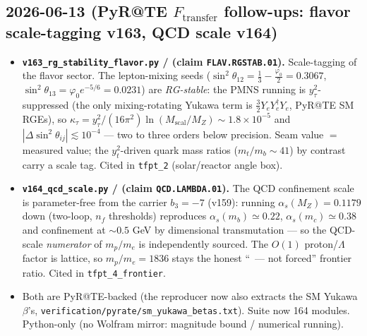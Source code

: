 \subsection*{2026-06-13 (PyR@TE $F_{\mathrm{transfer}}$ follow-ups: flavor scale-tagging v163, QCD scale v164)}
\begin{itemize}
\item \textbf{\texttt{v163\_rg\_stability\_flavor.py} \mE/\mC{} (claim \texttt{FLAV.RGSTAB.01}).}
  Scale-tagging of the flavor sector. The lepton-mixing seeds
  ($\sin^2\theta_{12}=\tfrac13-\tfrac{\varphi_0}{2}=0.3067$,
  $\sin^2\theta_{13}=\varphi_0 e^{-5/6}=0.0231$) are \emph{RG-stable}: the PMNS
  running is $y_\tau^2$-suppressed (the only mixing-rotating Yukawa term is
  $\tfrac32 Y_e Y_e^\dagger Y_e$, PyR@TE SM RGEs), so
  $\kappa_\tau=y_\tau^2/(16\pi^2)\ln(M_{\mathrm{scal}}/M_Z)\sim1.8\times10^{-5}$ and
  $|\Delta\sin^2\theta_{ij}|\lesssim10^{-4}$ --- two to three orders below precision.
  Seam value $=$ measured value; the $y_t^2$-driven quark mass ratios ($m_t/m_b\sim41$)
  by contrast carry a scale tag. Cited in \texttt{tfpt\_2} (solar/reactor angle box).
\item \textbf{\texttt{v164\_qcd\_scale.py} \mE/\mO{} (claim \texttt{QCD.LAMBDA.01}).}
  The QCD confinement scale is parameter-free from the carrier $b_3=-7$ (v159):
  running $\alpha_s(M_Z)=0.1179$ down (two-loop, $n_f$ thresholds) reproduces
  $\alpha_s(m_b)\simeq0.22$, $\alpha_s(m_c)\simeq0.38$ and confinement at
  $\sim0.5$ GeV by dimensional transmutation --- so the QCD-scale \emph{numerator} of
  $m_p/m_e$ is independently sourced. The $O(1)$ proton/$\Lambda$ factor is lattice, so
  $m_p/m_e=1836$ stays the honest ``\mO\ --- not forced'' frontier ratio. Cited in
  \texttt{tfpt\_4\_frontier}.
\item Both are PyR@TE-backed (the reproducer now also extracts the SM Yukawa $\beta$'s,
  \texttt{verification/pyrate/sm\_yukawa\_betas.txt}). Suite now 164 modules. Python-only
  (no Wolfram mirror: magnitude bound / numerical running).
\end{itemize}

